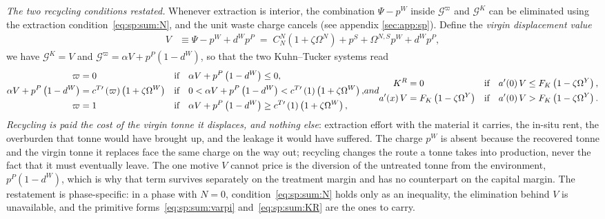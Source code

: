 \emph{The two recycling conditions restated.} Whenever extraction is interior, the combination
$\Psi-p^W$ inside $\mathcal G^\varpi$ and $\mathcal G^K$ can be eliminated using the extraction
condition~\eqref{eq:sp:sum:N}, and the unit waste charge cancels (see appendix \ref{sec:app:sp}). Define the \emph{virgin displacement value}
\begin{align}
V &\equiv \Psi-p^W+d^Wp^P \;=\; C^N_N\left(1+\zeta\Omega^N\right)+p^S+\Omega^{N,S}p^W+d^Wp^P,
\label{eq:sp:sum:V}
\end{align}
we have $\mathcal G^K=V$ and $\mathcal G^\varpi=\alpha V+p^P\left(1-d^W\right)$, so that the two
Kuhn--Tucker systems read
\begin{subequations}
\label{eq:sp:sum:recycling-virgin}
\begin{align}
\varpi &= 0
&&\text{if}\quad \alpha V+p^P\left(1-d^W\right)\le 0,
\notag
\\
\alpha V+p^P\left(1-d^W\right) &= c^{T\prime}\left(\varpi\right)\left(1+\zeta\Omega^W\right)
&&\text{if}\quad 0<\alpha V+p^P\left(1-d^W\right)<c^{T\prime}\left(1\right)\left(1+\zeta\Omega^W\right),
\notag
\\
\varpi &= 1
&&\text{if}\quad \alpha V+p^P\left(1-d^W\right)\ge c^{T\prime}\left(1\right)\left(1+\zeta\Omega^W\right),
\label{eq:sp:sum:recycling-virgin-varpi}
\end{align}
and
\begin{align}
K^R &= 0
&&\text{if}\quad a'\!\left(0\right)V\le F_K\left(1-\zeta\Omega^Y\right),
\notag
\\
a'\!\left(x\right)V &= F_K\left(1-\zeta\Omega^Y\right)
&&\text{if}\quad a'\!\left(0\right)V> F_K\left(1-\zeta\Omega^Y\right).
\label{eq:sp:sum:recycling-virgin-KR}
\end{align}
\end{subequations}
\emph{Recycling is paid the cost of the virgin tonne it displaces, and nothing else}: extraction
effort with the material it carries, the in-situ rent, the overburden that tonne would have brought
up, and the leakage it would have suffered. The charge $p^W$ is absent because the recovered tonne and
the virgin tonne it replaces face the same charge on the way out; recycling changes the route a
tonne takes into production, never the fact that it must eventually leave. The one motive $V$ cannot
price is the diversion of the untreated tonne from the environment, $p^P\left(1-d^W\right)$, which is
why that term survives separately on the treatment margin and has no counterpart on the capital
margin. The restatement is phase-specific: in a phase with $N=0$, condition~\eqref{eq:sp:sum:N}
holds only as an inequality, the elimination behind $V$ is unavailable, and the primitive
forms~\eqref{eq:sp:sum:varpi} and~\eqref{eq:sp:sum:KR} are the ones to carry.


